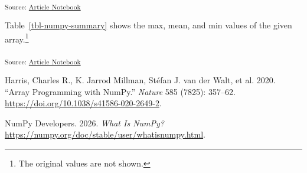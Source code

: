 \documentclass[
  letterpaper,
  DIV=11,
  numbers=noendperiod]{scrartcl}
\newlength{\cslhangindent}
\newenvironment{CSLReferences}[2] %
 {\begin{list}{}{%
  \setlength{\itemindent}{0pt}
  \setlength{\leftmargin}{0pt}
  \setlength{\parsep}{0pt}
  \ifodd #1
   \setlength{\leftmargin}{\cslhangindent}
   \setlength{\itemindent}{-1\cslhangindent}
  \fi
  \setlength{\itemsep}{#2\baselineskip}}}
 {\end{list}}
\begin{document}
\textsubscript{Source:
\href{https://HeyiCAo.github.io/first-quarto/index.qmd.html}{Article
Notebook}}

Table~\ref{tbl-numpy-summary} shows the max, mean, and min values of the
given array.\footnote{The original values are not shown.}

\textsubscript{Source:
\href{https://HeyiCAo.github.io/first-quarto/index.qmd.html}{Article
Notebook}}

\protect{}\label{refs}
\begin{CSLReferences}{1}{1}
{Harris, Charles R., K. Jarrod Millman, Stéfan J. van der Walt, et al.}
2020. {``Array Programming with NumPy.''} \emph{Nature} 585 (7825):
357--62. \url{https://doi.org/10.1038/s41586-020-2649-2}.

NumPy Developers. 2026. \emph{What Is NumPy?}
\url{https://numpy.org/doc/stable/user/whatisnumpy.html}.

\end{CSLReferences}
\end{document}

